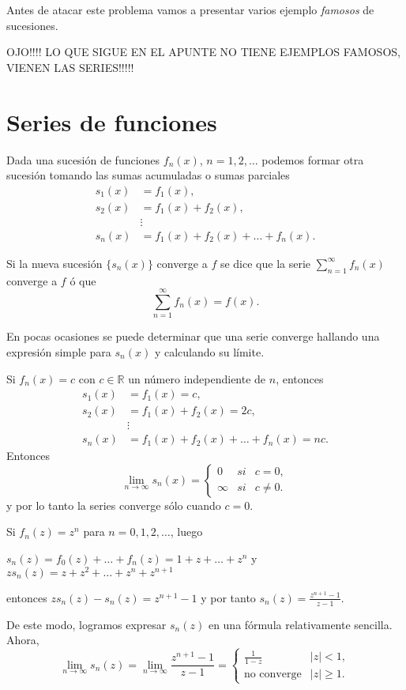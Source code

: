Antes de atacar este problema vamos a presentar varios ejemplo \textit{famosos} de sucesiones.


OJO!!!! LO QUE SIGUE EN EL APUNTE NO TIENE EJEMPLOS FAMOSOS, VIENEN LAS SERIES!!!!!

\section{Series de funciones}
Dada una sucesión de funciones $f_n(x)$, $n=1,2,\ldots$ podemos formar otra sucesión tomando las sumas acumuladas o
sumas parciales
\[
\begin{split}
s_1(x)&=f_1(x),
\\
s_2(x)&=f_1(x)+f_2(x),
\\
&\vdots
\\
s_n(x)&=f_1(x)+f_2(x)+\ldots+f_n(x).
\end{split}
\]

Si la nueva sucesión $\{s_n(x)\}$ converge a $f$ se dice que la serie $\sum\limits_{n=1}^{\infty} f_n(x)$
converge a $f$ ó que 
\[
\sum\limits_{n=1}^{\infty} f_n(x)=f(x).
\]

En pocas ocasiones se puede determinar que una serie converge hallando una expresión simple para $s_n(x)$ y
calculando su límite.

\begin{ejemplo}{}
Si $f_n(x)=c$ con $c \in \mathbb{R}$ un número independiente de $n$, entonces
\[
\begin{split}
s_1(x)&=f_1(x)=c,
\\
s_2(x)&=f_1(x)+f_2(x)=2c,
\\
&\vdots
\\
s_n(x)&=f_1(x)+f_2(x)+\ldots+f_n(x)=nc.
\end{split}
\]
Entonces
\[
\lim\limits_{n \to \infty} s_n(x)=
\left\{
\begin{array}{lll}
0&si&c=0,
\\
\infty&si&c\neq 0.
\end{array}
\right.
\]
y por lo tanto la series converge sólo cuando $c=0$.
\end{ejemplo}

\begin{ejemplo}{}
Si $f_n(z)=z^n$ para $n=0,1,2,\ldots$, luego
 
$s_n(z)=f_0(z)+\ldots+f_n(z)=1+z+\ldots+z^n$ y $zs_n(z)=z+z^2+\ldots+z^n+z^{n+1}$ 

entonces
$zs_n(z)-s_n(z)=z^{n+1}-1$ y por tanto $s_n(z)=\frac{z^{n+1}-1}{z-1}$.

De este modo, logramos expresar $s_n(z)$ en una fórmula relativamente sencilla. Ahora, 
\[
\lim\limits_{n \to \infty} s_n(z)=
\lim\limits_{n \to \infty} \frac{z^{n+1}-1}{z-1}=
\left\{\begin{array}{ll}
\frac{1}{1-z}&|z|<1,
\\
\mbox{no converge}&|z|\geq 1.
\end{array}
\right.
\]
\end{ejemplo}


